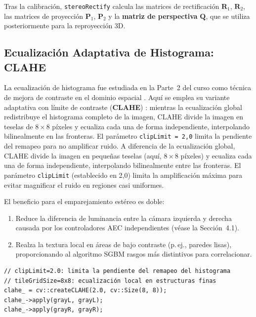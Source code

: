 \documentclass[12pt, a4paper]{article}
\begin{document}
Tras la calibración, \texttt{stereoRectify} calcula las matrices de rectificación
$\mathbf{R}_1$, $\mathbf{R}_2$, las matrices de proyección $\mathbf{P}_1$,
$\mathbf{P}_2$ y la \textbf{matriz de perspectiva} $\mathbf{Q}$, que se utiliza
posteriormente para la reproyección 3D.

\subsection{Ecualización Adaptativa de Histograma: CLAHE}
\label{sec:clahe}

La ecualización de histograma fue estudiada en la Parte~2 del curso como técnica de
mejora de contraste en el dominio espacial \cite{robles2026parte2}. Aquí se emplea
su variante adaptativa con límite de contraste (\textbf{CLAHE}) \cite{pizer1987adaptive}:
mientras la ecualización global redistribuye el histograma completo de la imagen,
CLAHE divide la imagen en teselas de $8\times8$ píxeles y ecualiza cada una de
forma independiente, interpolando bilinealmente en las fronteras. El parámetro
\texttt{clipLimit = 2{,}0} limita la pendiente del remapeo para no amplificar ruido. A diferencia de la ecualización global, CLAHE divide la
imagen en pequeñas teselas (aquí, $8 \times 8$ píxeles) y ecualiza cada una de forma
independiente, interpolando bilinealmente entre las fronteras. El parámetro
\texttt{clipLimit} (establecido en 2,0) limita la amplificación máxima para
evitar magnificar el ruido en regiones casi uniformes.

El beneficio para el emparejamiento estéreo es doble:
\begin{enumerate}
  \item Reduce la diferencia de luminancia entre la cámara izquierda y derecha
        causada por los controladores AEC independientes (véase la Sección~4.1).
  \item Realza la textura local en áreas de bajo contraste (p.\,ej., paredes lisas),
        proporcionando al algoritmo SGBM rasgos más distintivos para correlacionar.
\end{enumerate}

\begin{lstlisting}[style=cppstyle, caption={Aplicación de CLAHE en StereoProcessor.cpp.}]
// clipLimit=2.0: limita la pendiente del remapeo del histograma
// tileGridSize=8x8: ecualización local en estructuras finas
clahe_ = cv::createCLAHE(2.0, cv::Size(8, 8));
clahe_->apply(grayL, grayL);
clahe_->apply(grayR, grayR);
\end{lstlisting}
\end{document}
